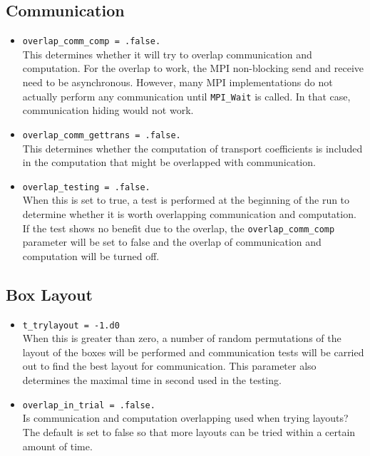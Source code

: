 \documentclass[11pt,letterpaper]{article}
\begin{document}
\subsection{Communication}

\begin{itemize}
\item {\tt overlap\_comm\_comp = .false.}\\
  This determines whether it will try to overlap communication and
  computation.  For the overlap to work, the MPI non-blocking send and
  receive need to be asynchronous.  However, many MPI implementations
  do not actually perform any communication until {\tt MPI\_Wait} is
  called.  In that case, communication hiding would not work.
\item {\tt overlap\_comm\_gettrans = .false.} \\
  This determines whether the computation of transport coefficients is
  included in the computation that might be overlapped with
  communication.
\item {\tt overlap\_testing = .false.} \\
  When this is set to true, a test is performed at the beginning of
  the run to determine whether it is worth overlapping communication
  and computation.  If the test shows no benefit due to the overlap,
  the {\tt overlap\_comm\_comp} parameter will be set to false and the
  overlap of communication and computation will be turned off.
\end{itemize}

\subsection{Box Layout}
\begin{itemize}
\item {\tt t\_trylayout = -1.d0} \\
  When this is greater than zero, a number of random permutations of
  the layout of the boxes will be performed and communication tests
  will be carried out to find the best layout for communication.  This
  parameter also determines the maximal time in second used in the
  testing.
\item {\tt overlap\_in\_trial = .false.}\\
  Is communication and computation overlapping used when trying
  layouts?  The default is set to false so that more layouts can be
  tried within a certain amount of time.
\end{itemize}
\end{document}
